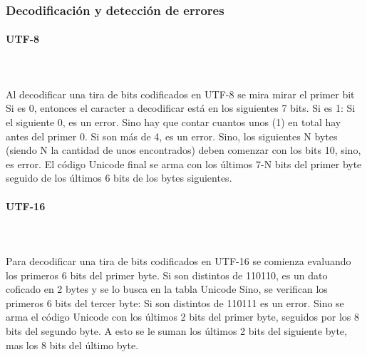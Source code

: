 \subsubsection{Decodificación y detección de errores}
\paragraph{UTF-8}\mbox{}\\\\
Al decodificar una tira de bits codificados en UTF-8 se mira mirar el primer bit
			Si es 0, entonces el caracter a decodificar está en los siguientes 7 bits.
			Si es 1:
				Si el siguiente 0, es un error.
				Sino hay que contar cuantos unos (1) en total hay antes del primer 0.
				Si son más de 4, es un error.
				Sino, los siguientes N bytes (siendo N la cantidad de unos 
				encontrados) deben comenzar con los bits 10, sino, es error.
				El código Unicode final se arma con los últimos 7-N bits del
				primer byte seguido de los últimos 6 bits de los bytes siguientes.

\paragraph{UTF-16}\mbox{}\\\\
Para decodificar una tira de bits codificados en UTF-16 se comienza evaluando 	los primeros 6 bits del primer byte.
			Si son distintos de 110110, es un dato coficado en 2 bytes y se lo
			busca en la tabla Unicode
			Sino, se verifican los primeros 6 bits del tercer byte:
				Si son distintos de 110111 es un error.
				Sino se arma el código Unicode con los últimos 2 bits del primer
				byte, seguidos por los 8 bits del segundo byte. A esto se le
				suman los últimos 2 bits del siguiente byte, mas los 8 bits del
				último byte.

